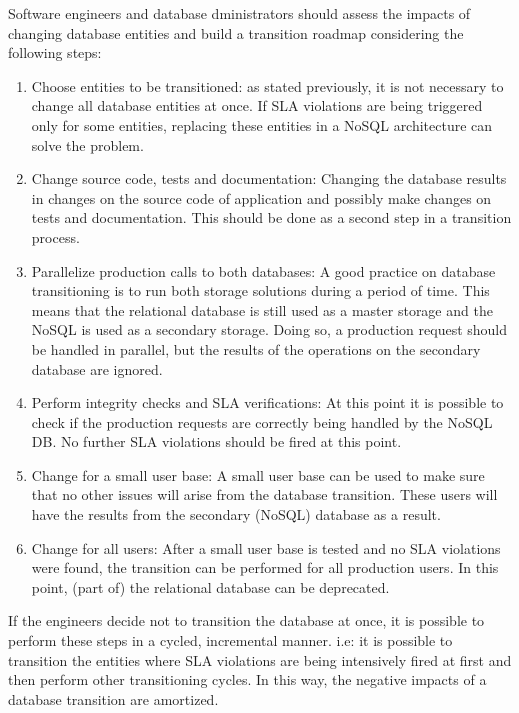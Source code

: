 Software engineers and database dministrators should assess the impacts of changing database entities and build a transition roadmap considering the following steps:

\begin{enumerate}
\item{Choose entities to be transitioned: as stated previously, it is not necessary to change all database entities at once. If SLA violations are being triggered only for some entities, replacing these entities in a NoSQL architecture can solve the problem.}
\item{Change source code, tests and documentation: Changing the database results in changes on the source code of application and possibly make changes on tests and documentation. This should be done as a second step in a transition process. }
\item{Parallelize production calls to both databases: A good practice on database transitioning is to run both storage solutions during a period of time. This means that the relational database is still used as a master storage and the NoSQL is used as a secondary storage. Doing so, a production request should be handled in parallel, but the results of the operations on the secondary database are ignored.}
\item{Perform integrity checks and SLA verifications: At this point it is possible to check if the production requests are correctly being handled by the NoSQL DB. No further SLA violations should be fired at this point.}
\item{Change for a small user base: A small user base can be used to make sure that no other issues will arise from the database transition. These users will have the results from the secondary (NoSQL) database as a result.  }
\item{Change for all users: After a small user base is tested and no SLA violations were found, the transition can be performed for all production users. In this point, (part of) the relational database can be deprecated.}

\end{enumerate}

If the engineers decide not to transition the database at once, it is possible to perform these steps in a cycled, incremental manner. i.e: it is possible to transition the entities where SLA violations are being intensively fired at first and then perform other transitioning cycles. In this way, the negative impacts of a database transition are amortized.
